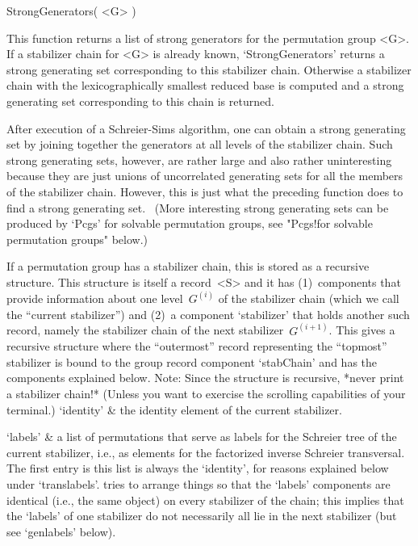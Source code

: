 \>StrongGenerators( <G> )

This function  returns a  list of  strong generators for  the permutation
group  <G>.    If a    stabilizer chain   for    <G>  is  already  known,
`StrongGenerators' returns a strong generating  set corresponding to this
stabilizer chain. Otherwise a stabilizer chain with the lexicographically
smallest   reduced base   is    computed and  a  strong  generating   set
corresponding to this chain is returned.

After execution  of a Schreier-Sims   algorithm, one can obtain a  strong
generating  set by joining together the  generators  at all levels of the
stabilizer chain. Such strong  generating sets, however, are rather large
and also    rather uninteresting   because   they  are just     unions of
uncorrelated generating sets for all the members of the stabilizer chain.
However, this  is just what the preceding  function does to find a strong
generating set.     \ (More interesting  strong   generating  sets can be
produced   by `Pcgs'  for  solvable  permutation  groups,  see  "Pcgs!for
solvable permutation groups" below.)


If a  permutation group  has a   stabilizer chain, this   is stored  as a
recursive structure. This  structure  is itself  a record~<S>  and it has
(1)~components that provide information about  one level~$G^{(i)}$ of the
stabilizer chain (which  we call  the  ``current stabilizer'')  and (2)~a
component `stabilizer'  that  holds   another such  record,   namely  the
stabilizer chain  of    the next stabilizer~$G^{(i+1)}$.  This  gives   a
recursive  structure  where the  ``outermost''  record  representing  the
``topmost'' stabilizer is bound to the group record component `stabChain'
and   has the components explained below.    Note: Since the structure is
recursive, *never print a stabilizer chain!* (Unless you want to exercise
the scrolling capabilities of your terminal.)
\beginitems
`identity' &
        the identity element of the current stabilizer.

`labels' &
        a list of permutations that serve as labels for the Schreier tree
        of  the current stabilizer,  i.e., as elements for the factorized
        inverse Schreier transversal.  The  first entry  is this list  is
        always the  `identity',    for  reasons explained   below   under
        `translabels'.  {\GAP}  tries  to  arrange   things so  that  the
        `labels' components are  identical (i.e., the same {\GAP} object)
        on every stabilizer of the chain;  this implies that the `labels'
        of   one stabilizer  do  not  necessarily   all lie  in the  next
        stabilizer (but see `genlabels' below).

